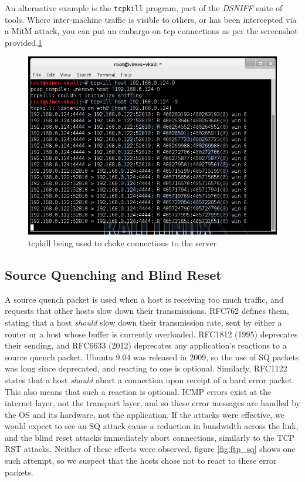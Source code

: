 An alternative example is the {\tt tcpkill} program, part of the \emph{DSNIFF} suite of tools. Where inter-machine
traffic is visible to others, or has been intercepted via a MitM attack, you can put an embargo on tcp connections as
per the screenshot provided.\ref{fig:tcpkill}

\begin{figure}[h]
    \centering
    \includegraphics[width=.5\linewidth]{images/tcpkill.png}
    \caption{tcpkill being used to choke connections to the server}
    \label{fig:tcpkill}
\end{figure}

\subsection{Source Quenching and Blind Reset}

A source quench packet is used when a host is receiving too much traffic, and requests that other hosts slow down their
transmissions. RFC762 defines them, stating that a host \emph{should} slow down their transmission rate, sent by either
a router or a host whose buffer is currently overloaded. RFC1812 (1995) deprecates their sending, and RFC6633 (2012)
deprecates any application's reactions to a source quench packet. Ubuntu 9.04 was released in 2009, so the use of SQ
packets was long since deprecated, and reacting to one is optional. Similarly, RFC1122 states that a host \emph{should}
abort a connection upon receipt of a hard error packet. This also means that such a reaction is optional. ICMP errors
exist at the internet layer, not the transport layer, and so these error messages are handled by the OS and its
hardware, not the application. If the attacks were effective, we would expect to see an SQ attack cause a reduction in
bandwidth across the link, and the blind reset attacks immediately abort connections, similarly to the TCP RST attacks.
Neither of these effects were observed, figure \ref{fig:ftp_sq} shows one such attempt, so we suspect that the hosts
chose not to react to these error packets.

